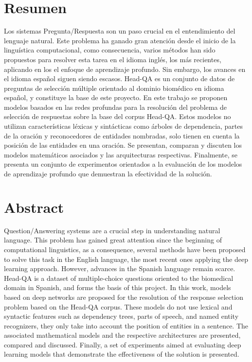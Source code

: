 \chapter*{Resumen}\label{chapter:resumen}

Los sistemas Pregunta/Respuesta son un paso crucial en el entendimiento del lenguaje natural. Este problema ha ganado gran atención desde el inicio de la linguística computacional, como consecuencia, varios métodos han sido propuestos para resolver esta tarea en el idioma inglés, los más recientes, aplicando en los el enfoque de aprendizaje profundo. Sin embargo, los avances en el idioma español siguen siendo escasos. Head-QA es un conjunto de datos de preguntas de selección múltiple orientado al dominio biomédico en idioma español, y constituye la base de este proyecto. En este trabajo se proponen modelos basados en las redes profundas para la resolución del problema de selección de respuestas sobre la base del corpus Head-QA. Estos modelos no utilizan características léxicas y sintácticas como árboles de dependencia, partes de la oración y reconocedores de entidades nombradas, solo tienen en cuenta la posición de las entidades en una oración. Se presentan, comparan y discuten los modelos matemáticos asociados y las arquitecturas respectivas. Finalmente, se presenta un conjunto de experimentos orientados a la evaluación de los modelos de aprendizaje profundo que demuestran la efectividad de la solución.

\newpage
\chapter*{Abstract}\label{chapter:abstract}

Question/Answering systems are a crucial step in understanding natural language. This problem has gained great attention since the beginning of computational linguistics, as a consequence, several methods have been proposed to solve this task in the English language, the most recent ones applying the deep learning approach. However, advances in the Spanish language remain scarce. Head-QA is a dataset of multiple-choice questions oriented to the biomedical domain in Spanish, and forms the basis of this project. In this work, models based on deep networks are proposed for the resolution of the response selection problem based on the Head-QA corpus. These models do not use lexical and syntactic features such as dependency trees, parts of speech, and named entity recognizers, they only take into account the position of entities in a sentence. The associated mathematical models and the respective architectures are presented, compared and discussed. Finally, a set of experiments aimed at evaluating deep learning models that demonstrate the effectiveness of the solution is presented.
